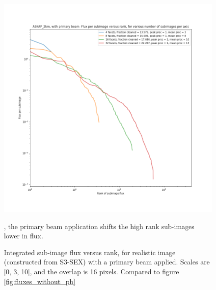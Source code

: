 \documentclass[11pt,a4paper,variablewidth]{article}
\begin{document}
\begin{figure}[H]
  \centering
  \includegraphics[width=\textwidth]{./fluxes_with_pb_ASKAP_2km.png}
  \caption{Integrated sub-image flux versus rank, for realistic image (constructed from S3-SEX) with a primary beam applied. Scales are [0, 3, 10], and the overlap is 16 pixels. Compared to figure \ref{fig:fluxes_without_pb}}, the primary beam application shifts the high rank sub-images lower in flux.
  \label{fig:fluxes_with_pb}
\end{figure}
\end{document}

